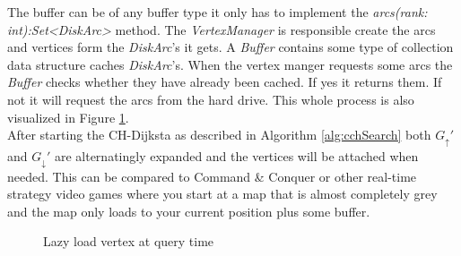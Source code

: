 The buffer can be of any buffer type it only has to implement the \textit{arcs(rank: int):Set<DiskArc>} method.
The \textit{VertexManager} is responsible create the arcs and vertices form the \textit{DiskArc}'s it gets.
A \textit{Buffer} contains some type of collection data structure caches \textit{DiskArc}'s.
When the vertex manger requests some arcs the \textit{Buffer} checks whether they have already been cached.
If yes it returns them.
If not it will request the arcs from the hard drive.
This whole process is also visualized in Figure \ref{fig:lazy_load_vertex}.
\\
After starting the CH-Dijksta as described in Algorithm \ref{alg:cchSearch} both $G_\uparrow'$ and $G_\downarrow'$ are alternatingly expanded and the vertices will be attached when needed.
This can be compared to Command \& Conquer or other real-time strategy video games where you start at a map that is almost completely grey and the map only loads to your current position plus some buffer.

\begin{figure}
    \centering
    
    \caption{Lazy load vertex at query time}
    \label{fig:lazy_load_vertex}
\end{figure}


%    
